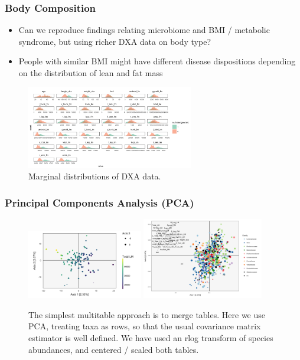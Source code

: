 \documentclass{beamer}
\begin{document}
\begin{frame}
  \frametitle{Body Composition}
  \begin{itemize}
  \item Can we reproduce findings relating microbiome and BMI / metabolic
    syndrome, but using richer DXA data on body type?
  \item People with similar BMI might have different disease dispositions
    depending on the distribution of lean and fat mass
  \end{itemize}
\begin{figure}[ht]
  \centering
  \includegraphics[width=0.65\textwidth]{figure/bc_histo}
  \caption{Marginal distributions of DXA data. \label{fig:bc_histo} }
\end{figure}

\end{frame}

\begin{frame}
  \frametitle{Principal Components Analysis (PCA)}
  \begin{figure}[ht]
    \centering
    \includegraphics[width=0.45\textwidth]{figure/pca_scores_lm}
    \includegraphics[width=0.47\textwidth]{figure/pca_loadings}
    \caption{The simplest multitable approach is to merge tables. Here we use
      PCA, treating taxa as rows, so that the usual covariance matrix estimator
      is well defined. We have used an rlog transform of species abundances, and
      centered / scaled both tables. \label{fig:pca_multitable}}
  \end{figure}
\end{frame}
\end{document}
